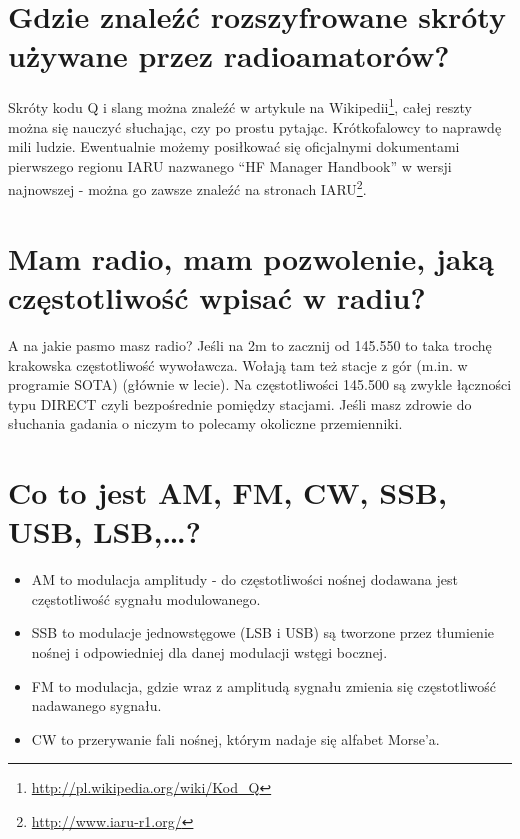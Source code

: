 \documentclass[a4paper,12pt]{article}
\begin{document}
\section{Gdzie znaleźć rozszyfrowane skróty używane przez radioamatorów?}
Skróty kodu Q i slang można znaleźć w artykule na Wikipedii\footnote{\url{http://pl.wikipedia.org/wiki/Kod_Q}}, całej reszty można się nauczyć słuchając, czy po prostu pytając. Krótkofalowcy to naprawdę mili ludzie. Ewentualnie możemy posiłkować się oficjalnymi dokumentami pierwszego regionu IARU nazwanego “HF Manager Handbook” w wersji najnowszej - można go zawsze znaleźć na stronach IARU\footnote{\url{http://www.iaru-r1.org/}}.

\section{Mam radio, mam pozwolenie, jaką częstotliwość wpisać w radiu?}
A na jakie pasmo masz radio?
Jeśli na 2m to zacznij od 145.550 to taka trochę krakowska częstotliwość wywoławcza. Wołają tam też stacje z gór (m.in. w programie SOTA) (głównie w lecie). Na częstotliwości 145.500 są zwykle łączności typu DIRECT czyli bezpośrednie pomiędzy stacjami. Jeśli masz zdrowie do słuchania gadania o niczym to polecamy okoliczne przemienniki.

\section{Co to jest AM, FM, CW, SSB, USB, LSB,…?}
\begin{itemize}
\item AM to modulacja amplitudy - do częstotliwości nośnej dodawana jest częstotliwość sygnału modulowanego. 
\item SSB to modulacje jednowstęgowe (LSB i USB) są tworzone przez tłumienie nośnej i odpowiedniej dla danej modulacji wstęgi bocznej. 
\item FM to modulacja, gdzie wraz z amplitudą sygnału zmienia się częstotliwość nadawanego sygnału. 
\item CW to przerywanie fali nośnej, którym nadaje się alfabet Morse'a. \end{itemize}
\end{document}
